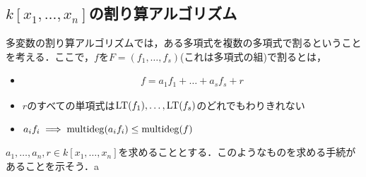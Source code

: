 \documentclass[9pt]{ltjsarticle}
\theoremstyle{break}
\theoremstyle{break}
\theoremstyle{break}
\theoremstyle{break}
\theoremstyle{break}
\theoremstyle{break}
\theoremstyle{break}
\theoremstyle{break}
\theoremstyle{break}
\theoremstyle{break}
\theoremstyle{break}
\theoremstyle{break}
\theoremstyle{break}
\theoremstyle{break}
\theoremstyle{break}
\theoremstyle{nonumberbreak}
\theoremstyle{nonumberbreak}
\begin{document}
\subsection{$k[x_1,\dots,x_n]$の割り算アルゴリズム}
多変数の割り算アルゴリズムでは，ある多項式を複数の多項式で割るということを考える．ここで，$f$を$F=(f_1,\dots,f_s)$(これは多項式の組)で割るとは，
\begin{itemize}
 \item
\begin{align}
 f = a_1 f_1 + \dots + a_s f_s + r
\end{align}
 \item
$r$のすべての単項式は${\rm LT}(f_1),\dots,{\rm LT}(f_s)$のどれでもわりきれない
 \item $a_i f_i \implies \mathrm{multideg}(a_i f_i) \le \mathrm{multideg}(f)$
\end{itemize}
$a_1,\dots,a_n,r \in k[x_1,\dots,x_n]$を求めることとする．このようなものを求める手続があることを示そう．a
\end{document}
